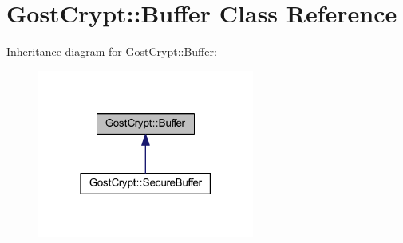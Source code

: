 \hypertarget{class_gost_crypt_1_1_buffer}{}\section{Gost\+Crypt\+:\+:Buffer Class Reference}
\label{class_gost_crypt_1_1_buffer}


Inheritance diagram for Gost\+Crypt\+:\+:Buffer\+:
\nopagebreak
\begin{figure}[H]
\begin{center}
\leavevmode
\includegraphics[width=202pt]{class_gost_crypt_1_1_buffer__inherit__graph}
\end{center}
\end{figure}

